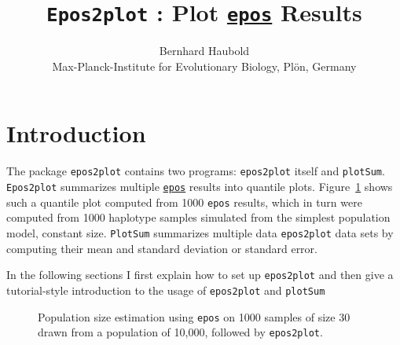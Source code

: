 \documentclass[a4paper]{article}
\newcommand{\ty}{\texttt}
\begin{document}
\title{\ty{Epos2plot} : Plot \href{http://github.com/evolbioinf/epos}{\ty{epos}} Results}
\author{Bernhard Haubold\\\small Max-Planck-Institute for Evolutionary
  Biology, Pl\"on, Germany}
\date{}
\maketitle
\section{Introduction}
The package \ty{epos2plot} contains two programs: \ty{epos2plot}
itself and \ty{plotSum}. 
\ty{Epos2plot} summarizes multiple
\href{http://github.com/evolbioinf/epos}{\ty{epos}} results into
quantile plots. Figure~\ref{fig:qua} shows such a quantile plot 
computed from 1000 \ty{epos} \citep{lyn19:inf} results, which in turn
were computed from 1000 haplotype samples simulated
from the simplest population model, constant size. \ty{PlotSum}
summarizes multiple data \ty{epos2plot} data sets by computing their
mean and standard deviation or standard error.

In the following sections I first explain how to set up \ty{epos2plot}
and then give a tutorial-style introduction to the usage of
\ty{epos2plot} and \ty{plotSum}

\begin{figure}
  \begin{center}
    \scalebox{0.6}{}
  \end{center}
  \caption{Population size estimation using \ty{epos} on 1000 samples
    of size 30 drawn from a population of 10,000, followed by
    \ty{epos2plot}.}\label{fig:qua}
\end{figure}
\end{document}

